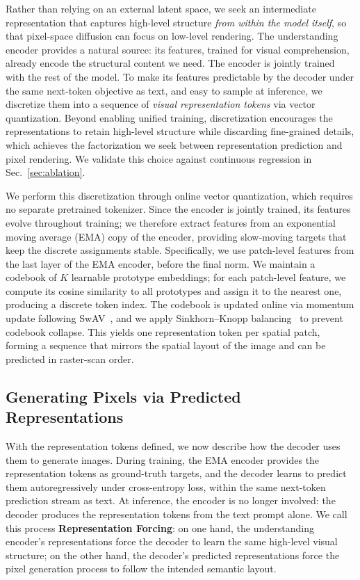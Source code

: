 Rather than relying on an external latent space, we seek an intermediate representation that captures high-level structure \emph{from within the model itself}, so that pixel-space diffusion can focus on low-level rendering. The understanding encoder provides a natural source: its features, trained for visual comprehension, already encode the structural content we need. The encoder is jointly trained with the rest of the model. To make its features predictable by the decoder under the same next-token objective as text, and easy to sample at inference, we discretize them into a sequence of \emph{visual representation tokens} via vector quantization. Beyond enabling unified training, discretization encourages the representations to retain high-level structure while discarding fine-grained details, which achieves the factorization we seek between representation prediction and pixel rendering. We validate this choice against continuous regression in Sec.~\ref{sec:ablation}.

We perform this discretization through online vector quantization, which requires no separate pretrained tokenizer. Since the encoder is jointly trained, its features evolve throughout training; we therefore extract features from an exponential moving average (EMA) copy of the encoder, providing slow-moving targets that keep the discrete assignments stable. Specifically, we use patch-level features from the last layer of the EMA encoder, before the final norm. We maintain a codebook of $K$ learnable prototype embeddings; for each patch-level feature, we compute its cosine similarity to all prototypes and assign it to the nearest one, producing a discrete token index. The codebook is updated online via momentum update following SwAV~\cite{swav}, and we apply Sinkhorn--Knopp balancing~\cite{knight2008sinkhorn} to prevent codebook collapse. This yields one representation token per spatial patch, forming a sequence that mirrors the spatial layout of the image and can be predicted in raster-scan order.




\subsection{Generating Pixels via Predicted Representations}
\label{sec:3.2}

With the representation tokens defined, we now describe how the decoder uses them to generate images. During training, the EMA encoder provides the representation tokens as ground-truth targets, and the decoder learns to predict them autoregressively under cross-entropy loss, within the same next-token prediction stream as text. At inference, the encoder is no longer involved: the decoder produces the representation tokens from the text prompt alone. We call this process \textbf{Representation Forcing}: on one hand, the understanding encoder's representations force the decoder to learn the same high-level visual structure; on the other hand, the decoder's predicted representations force the pixel generation process to follow the intended semantic layout.

